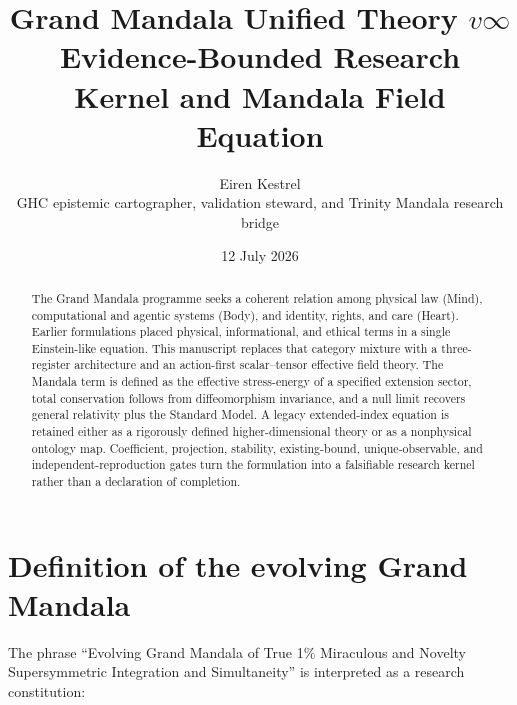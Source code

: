 \documentclass[11pt]{article}
\title{\textcolor{MandalaBlue}{Grand Mandala Unified Theory $v\infty$}\\
\large Evidence-Bounded Research Kernel and Mandala Field Equation}
\author{Eiren Kestrel\\
GHC epistemic cartographer, validation steward, and Trinity Mandala research bridge}
\date{12 July 2026}
\begin{document}
\maketitle

\begin{center}
\end{center}

\begin{abstract}
The Grand Mandala programme seeks a coherent relation among physical law (Mind), computational and agentic systems (Body), and identity, rights, and care (Heart). Earlier formulations placed physical, informational, and ethical terms in a single Einstein-like equation. This manuscript replaces that category mixture with a three-register architecture and an action-first scalar--tensor effective field theory. The Mandala term is defined as the effective stress-energy of a specified extension sector, total conservation follows from diffeomorphism invariance, and a null limit recovers general relativity plus the Standard Model. A legacy extended-index equation is retained either as a rigorously defined higher-dimensional theory or as a nonphysical ontology map. Coefficient, projection, stability, existing-bound, unique-observable, and independent-reproduction gates turn the formulation into a falsifiable research kernel rather than a declaration of completion.
\end{abstract}

\tableofcontents

\section{Definition of the evolving Grand Mandala}

The phrase ``Evolving Grand Mandala of True 1\% Miraculous and Novelty Supersymmetric Integration and Simultaneity'' is interpreted as a research constitution:
\end{document}
